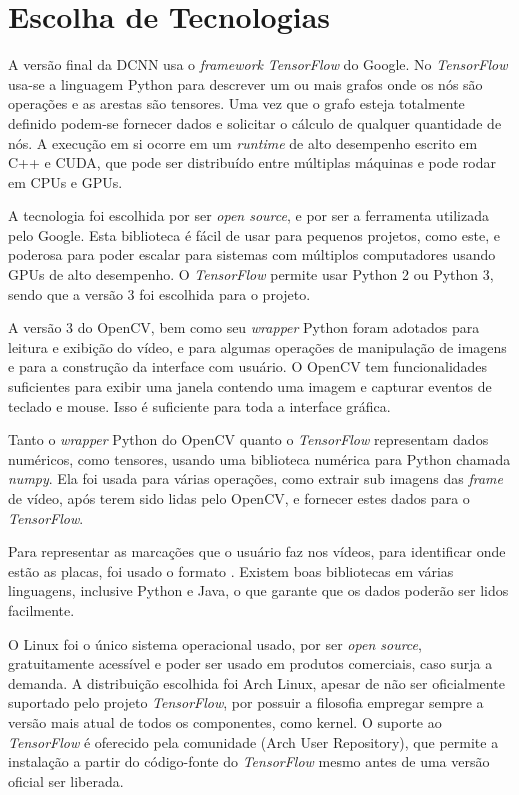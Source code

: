 \section{Escolha de Tecnologias}
A versão final da DCNN usa o \emph{framework} \emph{TensorFlow} do Google.
No \emph{TensorFlow} usa-se a linguagem Python para descrever um ou mais
grafos onde
os nós são operações e as arestas são tensores. Uma vez que o grafo esteja
totalmente definido podem-se fornecer dados e solicitar o cálculo de qualquer
quantidade de nós. A execução em si ocorre em um \emph{runtime} de alto
desempenho escrito em C++ e CUDA, que pode ser distribuído entre múltiplas
máquinas e pode rodar em CPUs e GPUs.

A tecnologia foi escolhida por ser \emph{open source}, e por ser a ferramenta
utilizada pelo Google. Esta biblioteca é fácil de usar para pequenos projetos,
como este, e poderosa para poder escalar para sistemas com múltiplos
computadores usando GPUs de alto desempenho. O \emph{TensorFlow} permite usar
Python 2 ou Python 3, sendo que a versão 3 foi escolhida para o projeto.

A versão 3 do OpenCV, bem como seu \emph{wrapper} Python foram adotados para
leitura e exibição do vídeo, e para algumas operações de manipulação de
imagens e para a construção da interface com usuário. O OpenCV tem
funcionalidades suficientes para exibir uma janela contendo
uma imagem e capturar eventos de teclado e mouse. Isso é suficiente para toda a
interface gráfica.

Tanto o \emph{wrapper} Python do OpenCV quanto o \emph{TensorFlow} representam
dados numéricos, como tensores, usando uma biblioteca numérica para
Python chamada \emph{numpy}. Ela foi usada para várias operações, como
extrair sub imagens
das \emph{frame} de vídeo, após terem sido lidas pelo OpenCV, e fornecer
estes dados para o \emph{TensorFlow}.

Para representar as marcações que o usuário faz nos vídeos, para identificar
onde estão as placas, foi usado o formato .
Existem boas
bibliotecas em várias linguagens, inclusive Python e Java, o que garante que os
dados poderão ser lidos facilmente.

O Linux foi o único sistema operacional usado, por ser \emph{open source},
gratuitamente acessível e poder ser usado em produtos comerciais, caso surja a
demanda. A distribuição escolhida foi Arch Linux, apesar de não ser
oficialmente suportado pelo projeto \emph{TensorFlow}, por possuir a filosofia
empregar sempre a versão mais atual de todos os componentes, como kernel. O
suporte ao \emph{TensorFlow} é oferecido pela comunidade
 (Arch User Repository), que permite a instalação a partir do
código-fonte do \emph{TensorFlow} mesmo antes de uma versão oficial ser liberada.

